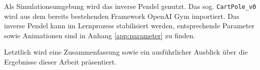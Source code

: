	Als Simulationsumgebung wird das inverse Pendel genutzt. Das sog. \texttt{CartPole\_v0} wird aus dem bereits bestehenden Framework OpenAI Gym \cite{Brockman2016} importiert. Das inverse Pendel kann im Lernprozess stabilisiert werden, entsprechende Parameter sowie Animationen sind in Anhang \ref{app:parameter} zu finden.
	
	Letztlich wird eine Zusammenfassung sowie ein ausführlicher Ausblick über die Ergebnisse dieser Arbeit präsentiert.

